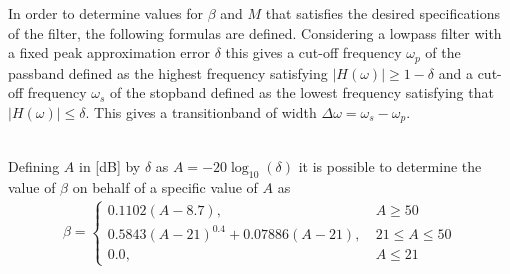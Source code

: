 In order to determine values for $\beta$ and $M$ that satisfies the desired specifications of the filter, the following formulas are defined. Considering a lowpass filter with a fixed peak approximation error $\delta$ this gives a cut-off frequency $\omega_p$ of the passband defined as the highest frequency satisfying $|H(\omega)| \geq 1-\delta$ and a cut-off frequency $\omega_s$ of the stopband defined as the lowest frequency satisfying that $|H(\omega)| \leq \delta$. This gives a transitionband of width $\Delta \omega = \omega_s - \omega_p$. 

 \\
Defining $A$ in [dB] by $\delta$ as $A = -20\log_{10} (\delta)$ it is possible to determine the value of $\beta$ on behalf of a specific value of $A$ as \cite{page 566, DTSP}
\begin{align}
\beta =
\left\{ \begin{matrix}
0.1102\left( A-8.7 \right), &\ A \geq 50 \\
0.5843\left(A-21\right)^{0.4}+0.07886(A-21), &\ 21 \leq A \leq 50 \\
0.0, &\  A \leq 21 
\end{matrix}\right.
\end{align}
       
